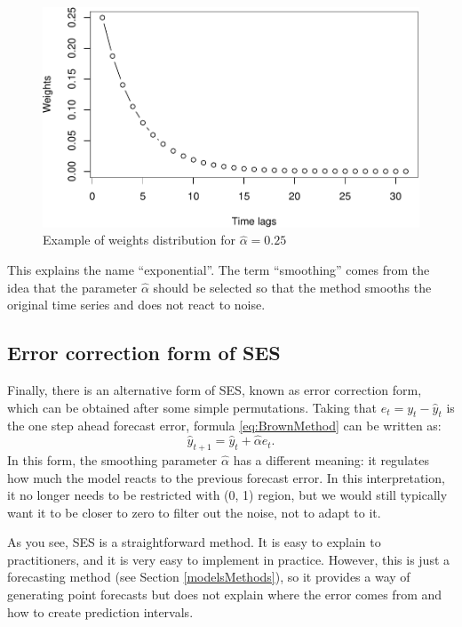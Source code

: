 \documentclass[
]{book}
\theoremstyle{definition}
\theoremstyle{definition}
\theoremstyle{definition}
\theoremstyle{definition}
\theoremstyle{remark}
\begin{document}
\begin{figure}
\centering
\includegraphics{Svetunkov--2022----ADAM_files/figure-latex/BrownExponentialExample-1.pdf}
\caption{\label{fig:BrownExponentialExample}Example of weights distribution for \(\hat{\alpha}=0.25\)}
\end{figure}

This explains the name ``exponential''. The term ``smoothing'' comes from the idea that the parameter \(\hat{\alpha}\) should be selected so that the method smooths the original time series and does not react to noise.

\hypertarget{SESEC}{%
\subsection{Error correction form of SES}\label{SESEC}}

Finally, there is an alternative form of SES, known as error correction form, which can be obtained after some simple permutations. Taking that \(e_t=y_t-\hat{y}_t\) is the one step ahead forecast error, formula \eqref{eq:BrownMethod} can be written as:
\begin{equation}
  \hat{y}_{t+1} = \hat{y}_{t} + \hat{\alpha} e_{t}.
  \label{eq:SESErrorCorrection}
\end{equation}
In this form, the smoothing parameter \(\hat{\alpha}\) has a different meaning: it regulates how much the model reacts to the previous forecast error. In this interpretation, it no longer needs to be restricted with (0, 1) region, but we would still typically want it to be closer to zero to filter out the noise, not to adapt to it.

As you see, SES is a straightforward method. It is easy to explain to practitioners, and it is very easy to implement in practice. However, this is just a forecasting method (see Section \ref{modelsMethods}), so it provides a way of generating point forecasts but does not explain where the error comes from and how to create prediction intervals.
\end{document}
